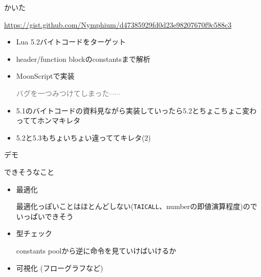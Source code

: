 \begin{frame}
	\frametitlesec

	かいた

	{\tiny\url{https://gist.github.com/Nymphium/d47385929fd0d23e98207670f9c588c3}}
	\begin{itemize}
		\item Lua 5.2バイトコードをターゲット
		\item header/function blockのconstantsまで解析
		\item MoonScriptで実装

			\textcolor{gray}{\tiny{}バグを一つみつけてしまった$\cdots\cdots$}
		\item 5.1のバイトコードの資料見ながら実装していったら5.2とちょこちょこ変わっててホンマキレタ
		\item 5.2と5.3もちょいちょい違っててキレタ(2)
	\end{itemize}
\end{frame}
\begin{frame}
	\frametitlesec
	\begin{center}
		\Huge{}デモ
	\end{center}
\end{frame}
\begin{frame}[fragile]
	\frametitlesec

	できそうなこと
	\begin{itemize}
		\item 最適化

			最適化っぽいことはほとんどしない(\lstinline{TAICALL}、numberの即値演算程度)のでいっぱいできそう
		\item 型チェック

			constants poolから逆に命令を見ていけばいけるか
		\item 可視化 (フローグラフなど)
	\end{itemize}
\end{frame}
